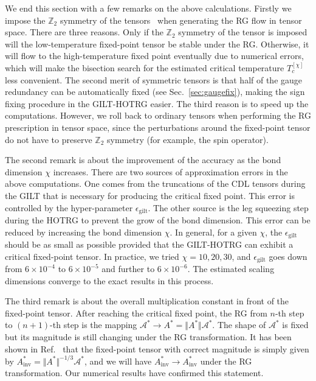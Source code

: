 \documentclass[aps,prr,reprint,superscriptaddress,floatfix]{revtex4-2}
\begin{document}
We end this section with a few remarks on the above calculations. 
Firstly we impose the $\mathbb{Z}_2$ symmetry of the tensors~\cite{Singh2010SymTen, Singh2011U1Ten} when generating the RG flow in tensor space. 
There are three reasons. 
Only if the $\mathbb{Z}_2$ symmetry of the tensor is imposed will the low-temperature fixed-point tensor be stable under the RG.  
Otherwise, it will flow to the high-temperature fixed point eventually due to numerical errors, which will make the bisection search for the estimated critical temperature $T_c^{[\chi]}$ less convenient. 
The second merit of symmetric tensors is that half of the gauge redundancy can be automatically fixed (see Sec.~\ref{sec:gaugefix}), making the sign fixing procedure in the GILT-HOTRG easier. 
The third reason is to speed up the computations. 
However, we roll back to ordinary tensors when performing the RG prescription in tensor space, since the perturbations around the fixed-point tensor do not have to preserve $\mathbb{Z}_2$ symmetry (for example, the spin operator). 
%

The second remark is about the improvement of the accuracy as the bond dimension $\chi$ increases. 
There are two sources of approximation errors in the above computations. 
One comes from the truncations of the CDL tensors during the GILT that is necessary for producing the critical fixed point. 
This error is controlled by the hyper-parameter $\epsilon_{\text{gilt}}$. 
The other source is the leg squeezing step during the HOTRG to prevent the grow of the bond dimension.
This error can be reduced by increasing the bond dimension $\chi$. 
In general, for a given $\chi$, the $\epsilon_{\text{gilt}}$ should be as small as possible provided that the GILT-HOTRG can exhibit a critical fixed-point tensor. 
In practice, we tried $\chi = 10, 20, 30$, and $\epsilon_{\text{gilt}}$ goes down from $6\times 10^{-4}$ to $6\times10^{-5}$ and further to $6\times10^{-6}$. 
The estimated scaling dimensions converge to the exact results in this process. 
%

The third remark is about the overall multiplication constant in front of the fixed-point tensor. 
After reaching the critical fixed point, the RG from $n$-th step to $(n+1)$-th step is the mapping $\mathcal{A}^{*}\rightarrow A^{*} = \Vert A^{*} \Vert \mathcal{A}^{*}$. 
The shape of $\mathcal{A}^*$ is fixed but its magnitude is still changing under the RG transformation. 
It has been shown in Ref.~\cite{GuWen2009} that the fixed-point tensor with correct magnitude is simply given by $A^*_{\text{inv}} = \Vert A^* \Vert^{-1/3} \mathcal{A}^*$, and we will have $A^*_{\text{inv}}\rightarrow A^*_{\text{inv}}$ under the RG transformation.
Our numerical results have confirmed this statement.
%
\end{document}
